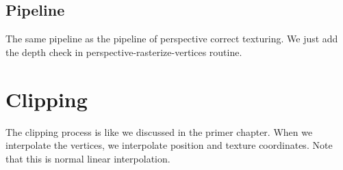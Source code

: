 \subsection{Pipeline}
The same pipeline as the pipeline of perspective correct texturing. We just add the depth check in perspective-rasterize-vertices routine.
\section{Clipping}
The clipping process is like we discussed in the primer chapter. When we interpolate the vertices,  we interpolate position and texture coordinates. Note that this is normal linear interpolation.

\clearpage